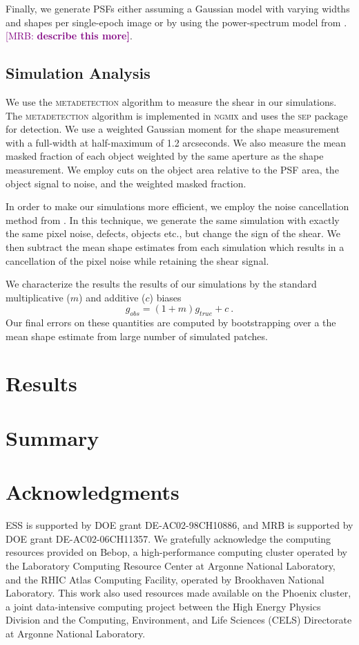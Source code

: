 \documentclass[twocolappendix, appendixfloats, numberedappendix, twocolumn, apj]{openjournal}
\newcommand{\mrb}[1]{\textcolor{purple}{[MRB: \bf #1]}\xspace}
\newcommand{\mdet}{\textsc{metadetection}\xspace}
\newcommand{\ngmix}{\textsc{ngmix}\xspace}
\newcommand{\sep}{\textsc{sep}\xspace}
\begin{document}
Finally, we generate PSFs either assuming a Gaussian model with varying widths and shapes
per single-epoch image or by using the power-spectrum model from \citep{mdet}. \mrb{describe this more}.

\subsection{Simulation Analysis}

We use the \mdet algorithm to measure the shear in our simulations. The \mdet algorithm is implemented in
\ngmix and uses the \sep package \citep{sep} for detection. We use a weighted Gaussian moment for the shape
measurement with a full-width at half-maximum of 1.2 arcseconds. We also measure the mean masked fraction
of each object weighted by the same aperture as the shape measurement. We employ cuts on the object area relative to
the PSF area, the object signal to noise, and the weighted masked fraction.

In order to make our simulations more efficient, we employ the noise cancellation method from \citet{}. In this technique,
we generate the same simulation with exactly the same pixel noise, defects, objects etc., but change the sign of
the shear. We then subtract the mean shape estimates from each simulation which results in a cancellation of
the pixel noise while retaining the shear signal.

We characterize the results the results of our simulations by the standard multiplicative ($m$) and additive ($c$) biases
\begin{equation}
g_{obs} = (1+m)g_{true} + c\ .
\end{equation}
Our final errors on these quantities are computed by bootstrapping over a the mean shape estimate from large
number of simulated patches.

\section{Results}\label{sec:results}

\section{Summary}\label{sec:conc}

\section*{Acknowledgments}

ESS is supported by DOE grant DE-AC02-98CH10886, and MRB is supported by DOE
grant DE-AC02-06CH11357.  We gratefully acknowledge the computing resources
provided on Bebop, a high-performance computing cluster operated by the
Laboratory Computing Resource Center at Argonne National Laboratory, and the
RHIC Atlas Computing Facility, operated by Brookhaven National Laboratory.
This work also used resources made available on the Phoenix cluster, a joint
data-intensive computing project between the High Energy Physics Division and
the Computing, Environment, and Life Sciences (CELS) Directorate at Argonne
National Laboratory.




\end{document}

